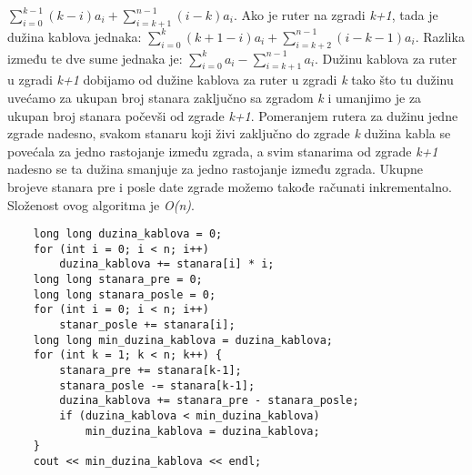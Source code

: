 \documentclass{article}
\begin{document}
$\sum_{i=0}^{k-1} (k-i)a_i + \sum_{i=k+1}^{n-1} (i-k)a_i$. Ako je ruter na zgradi \textit{k+1}, tada je dužina kablova jednaka: 
$\sum_{i=0}^{k} (k+1-i)a_i + \sum_{i=k+2}^{n-1} (i-k-1)a_i$. Razlika između te dve sume jednaka je:
$\sum_{i=0}^{k} a_i - \sum_{i=k+1}^{n-1} a_i$.
\newline Dužinu kablova za ruter u zgradi \textit{k+1} dobijamo od dužine kablova za ruter
u zgradi \textit{k} tako što tu dužinu uvećamo za ukupan broj stanara zaključno sa
zgradom \textit{k} i umanjimo je za ukupan broj stanara počevši od zgrade \textit{k+1}. Pomeranjem rutera za dužinu jedne zgrade nadesno, svakom stanaru
koji živi zaključno do zgrade \textit{k} dužina kabla se povećala za jedno rastojanje
između zgrada, a svim stanarima od zgrade \textit{k+1} nadesno se ta dužina smanjuje
za jedno rastojanje između zgrada. Ukupne brojeve stanara pre i posle date zgrade možemo takođe računati inkrementalno. Složenost ovog algoritma je \textit{O(n)}.
\begin{lstlisting}
    long long duzina_kablova = 0;
    for (int i = 0; i < n; i++)
        duzina_kablova += stanara[i] * i;
    long long stanara_pre = 0;
    long long stanara_posle = 0;
    for (int i = 0; i < n; i++)
        stanar_posle += stanara[i];
    long long min_duzina_kablova = duzina_kablova;
    for (int k = 1; k < n; k++) {
        stanara_pre += stanara[k-1];
        stanara_posle -= stanara[k-1];
        duzina_kablova += stanara_pre - stanara_posle;
        if (duzina_kablova < min_duzina_kablova)
            min_duzina_kablova = duzina_kablova;
    }
    cout << min_duzina_kablova << endl;
\end{lstlisting}
\end{document}
